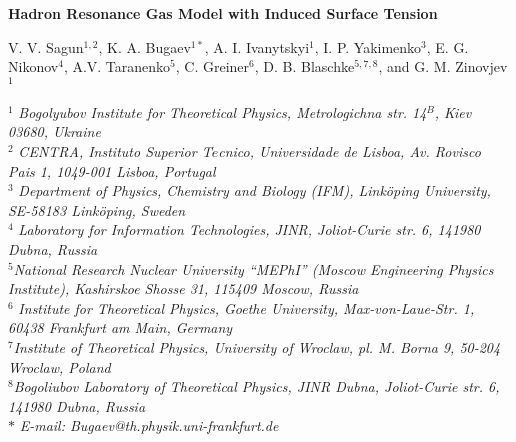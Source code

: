 \documentclass[12pt]{article}
\begin{document}
\begin{center}
{\bfseries Hadron Resonance Gas Model  with Induced Surface Tension}

\vskip 5mm

V. V. Sagun$^{1,2}$, K. A. Bugaev$^{1 *}$,   A. I. Ivanytskyi$^{1}$,  I. P. Yakimenko$^{3}$,
E. G. Nikonov$^{4}$,  A.V. Taranenko$^{5}$,
C. Greiner$^{6}$, 
D. B. Blaschke$^{5, 7, 8}$, 
and G. M. Zinovjev$^{1}$



\vskip 5mm

{\small
$^1${\it
Bogolyubov Institute for Theoretical Physics, Metrologichna str. 14$^B$, Kiev 03680, Ukraine
}
\\
$^2${\it
CENTRA, Instituto Superior T$\acute{e}$cnico, Universidade de Lisboa,
Av. Rovisco Pais 1, 1049-001 Lisboa, Portugal
}
\\
$^{3}${\it
Department of Physics, Chemistry and Biology (IFM), Link\"oping University, SE-58183 Link\"oping, Sweden
}
\\
$^4${\it
Laboratory for Information Technologies, JINR, Joliot-Curie str. 6, 141980 Dubna, Russia
}
\\
$^5${\it National Research Nuclear University ``MEPhI'' (Moscow Engineering Physics
Institute), Kashirskoe Shosse 31, 115409 Moscow, Russia}
\\
%
$^6${\it
Institute for  Theoretical Physics, Goethe University, Max-von-Laue-Str. 1, 60438 Frankfurt am Main, Germany
}
\\
%
$^7${\it Institute of Theoretical Physics, University of Wroclaw, pl. M. Borna 9, 50-204 Wroclaw, Poland}
\\
%
$^8${\it Bogoliubov Laboratory of Theoretical Physics, JINR Dubna, Joliot-Curie str. 6, 141980 Dubna, Russia}
\\
$*$ {\it
E-mail: Bugaev@th.physik.uni-frankfurt.de
}}
\end{center}



\vskip5mm
\end{document}
